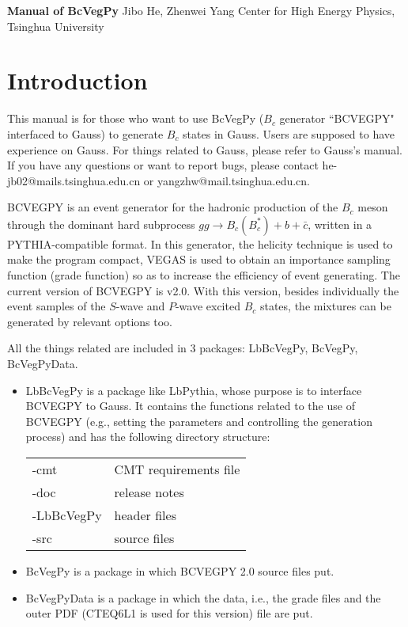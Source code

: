 \documentclass[12pt]{article}
\begin{document}
\vskip 1cm
\begin{center}
{\Large \bf Manual of BcVegPy \vskip 0.5cm} \vskip 0cm {Jibo He,
Zhenwei Yang} \vskip 0cm \vskip 0cm {Center for High Energy Physics,
Tsinghua University} \vskip 0cm\
\end{center}

\section{Introduction}
This manual is for those who want to use BcVegPy ($B_c$ generator
``BCVEGPY" \cite{BCVEGPY} interfaced to Gauss) to generate $B_c$
states in Gauss. Users are supposed to have experience on Gauss. For
things related to Gauss, please refer to Gauss's manual. If you have
any questions or want to report bugs, please contact
he-jb02@mails.tsinghua.edu.cn or yangzhw@mail.tsinghua.edu.cn.

BCVEGPY is an event generator for the hadronic production of the
$B_c$ meson through the dominant hard subprocess $gg\rightarrow
B_c(B_c^{*})+b+\bar{c}$, written in a PYTHIA-compatible format. In
this generator, the helicity technique is used to make the program
compact, VEGAS is used to obtain an importance sampling function
(grade function) so as to increase the efficiency of event
generating. The current version of BCVEGPY is v2.0. With this
version, besides individually the event samples of the $S$-wave and
$P$-wave excited $B_c$ states,
the mixtures can be generated by relevant options too.

All the things related are included in 3 packages: LbBcVegPy,
BcVegPy, BcVegPyData.
\begin{itemize}
\item LbBcVegPy is a package like LbPythia, whose purpose is to interface BCVEGPY to Gauss.
It contains the functions related to the use of BCVEGPY (e.g., setting the parameters and
controlling the generation process) and has the following directory structure:

\begin{tabular}{|l l|}
\hline
   -cmt      & CMT requirements file \\
   -doc      & release notes \\
   -LbBcVegPy  & header files \\
   -src      & source files\\
\hline
\end{tabular}
\item BcVegPy is a package in which BCVEGPY 2.0 source files put.
\item BcVegPyData is a package in which the data, i.e., the grade files and the outer PDF
(CTEQ6L1 is used for this version) file are put.
\end{itemize}
\end{document}
